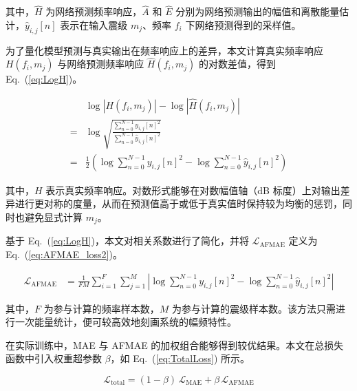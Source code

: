 \documentclass[sn-nature]{sn-jnl}
\newcommand{\magn}{m} %
\newcommand{\fidx}{i} %
\newcommand{\fmax}{F} %
\newcommand{\midx}{j} %
\newcommand{\mmax}{M} %
\newcommand{\pidx}{n} %
\newcommand{\pmax}{N} %
\newcommand{\wMAE}{\beta} %
\newcommand{\pred}[1]{\hat{#1}} %
\begin{document}
其中，$\pred{H}$ 为网络预测频率响应，$\pred{A}$ 和 $\hat{E}$ 分别为网络预测输出的幅值和离散能量估计，$\hat{y}_{\fidx,\midx}[n]$ 表示在输入震级 $\magn_\midx$、频率 $f_\fidx$ 下网络预测得到的采样值。

为了量化模型预测与真实输出在频率响应上的差异，本文计算真实频率响应 $H(f_\fidx,\magn_\midx)$ 与网络预测频率响应 $\pred{H}(f_\fidx,\magn_\midx)$ 的对数差值，得到 Eq.~(\ref{eq:LogH})。

\begin{equation}
    \begin{aligned}
          & \log  \left|H(f_\fidx,\magn_\midx)\right|  - \log\left|\pred{H}(f_\fidx, \magn_\midx)\right|                                            \\
        = & \log \sqrt{\frac{\sum_{\pidx=0}^{\pmax-1}y_{\fidx,\midx}[n]^2}{{\sum_{\pidx=0}^{\pmax-1}\hat{y}_{\fidx,\midx}[n]^2}}}                   \\
        = & \frac{1}{2} \left( \log \sum_{\pidx=0}^{\pmax-1}y_{\fidx,\midx}[n]^2 -  \log \sum_{\pidx=0}^{\pmax-1}\hat{y}_{\fidx,\midx}[n]^2 \right)
    \end{aligned}
    \label{eq:LogH}
\end{equation}

其中，$H$ 表示真实频率响应。对数形式能够在对数幅值轴（dB 标度）上对输出差异进行更对称的度量，从而在预测值高于或低于真实值时保持较为均衡的惩罚，同时也避免显式计算 $\magn_\midx$。

基于 Eq.~(\ref{eq:LogH})，本文对相关系数进行了简化，并将 $\mathcal{L}_{\text{AFMAE}}$ 定义为 Eq.~(\ref{eq:AFMAE_loss2})。

\begin{equation}
    \begin{aligned}
        \mathcal{L}_{\text{AFMAE}} & =  \frac{1}{\fmax\mmax} \sum_{\fidx=1}^{\fmax} \sum_{\midx=1}^{\mmax}
        \left|
        \log \sum_{\pidx=0}^{\pmax-1}y_{\fidx,\midx}[n]^2
        - \log \sum_{\pidx=0}^{\pmax-1}\hat{y}_{\fidx,\midx}[n]^2
        \right|
    \end{aligned}
    \label{eq:AFMAE_loss2}
\end{equation}

其中，$\fmax$ 为参与计算的频率样本数，$\mmax$ 为参与计算的震级样本数。该方法只需进行一次能量统计，便可较高效地刻画系统的幅频特性。

在实际训练中，MAE 与 AFMAE 的加权组合能够得到较优结果。本文在总损失函数中引入权重超参数 $\wMAE$，如 Eq.~(\ref{eq:TotalLoss}) 所示。

\begin{equation}
    \mathcal{L}_{\text{total}}
    = (1-\wMAE)\,\mathcal{L}_{\text{MAE}}
    + \wMAE\,\mathcal{L}_{\text{AFMAE}}
    \label{eq:TotalLoss}
\end{equation}
\end{document}
